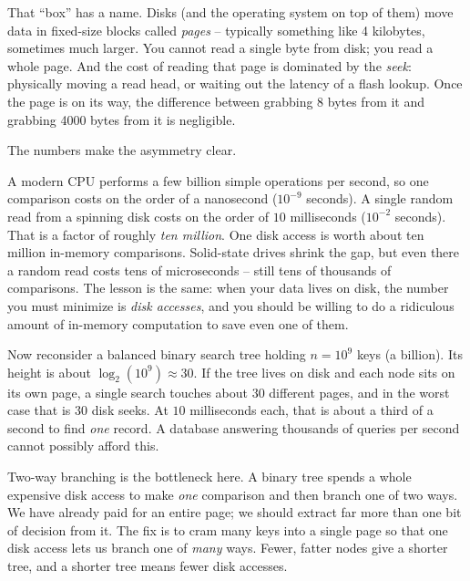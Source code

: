 That ``box'' has a name. Disks (and the operating system on top of them) move data
in fixed-size blocks called \emph{pages} -- typically something like 4 kilobytes,
sometimes much larger. You cannot read a single byte from disk; you read a whole
page. And the cost of reading that page is dominated by the \emph{seek}: physically
moving a read head, or waiting out the latency of a flash lookup. Once the page is
on its way, the difference between grabbing 8 bytes from it and grabbing 4000 bytes
from it is negligible.

The numbers make the asymmetry clear.

\begin{aestheticbox}
A modern CPU performs a few billion simple operations per second, so one
comparison costs on the order of a nanosecond ($10^{-9}$ seconds). A single random
read from a spinning disk costs on the order of $10$ milliseconds ($10^{-2}$
seconds). That is a factor of roughly \emph{ten million}. One disk access is worth
about ten million in-memory comparisons. Solid-state drives shrink the gap, but
even there a random read costs tens of microseconds -- still tens of thousands of
comparisons. The lesson is the same: when your data lives on disk, the number you
must minimize is \emph{disk accesses}, and you should be willing to do a
ridiculous amount of in-memory computation to save even one of them.
\end{aestheticbox}

Now reconsider a balanced binary search tree holding $n = 10^9$ keys (a billion).
Its height is about $\log_2(10^9) \approx 30$. If the tree lives on disk and each
node sits on its own page, a single search touches about $30$ different pages, and
in the worst case that is $30$ disk seeks. At $10$ milliseconds each, that is about
a third of a second to find \emph{one} record. A database answering thousands of
queries per second cannot possibly afford this.

\begin{focusbox}
Two-way branching is the bottleneck here. A binary tree spends a
whole expensive disk access to make \emph{one} comparison and then branch one
of two ways. We have already paid for an entire page; we should extract far more
than one bit of decision from it. The fix is to cram many keys into a single page
so that one disk access lets us branch one of \emph{many} ways. Fewer, fatter nodes
give a shorter tree, and a shorter tree means fewer disk accesses.
\end{focusbox}

